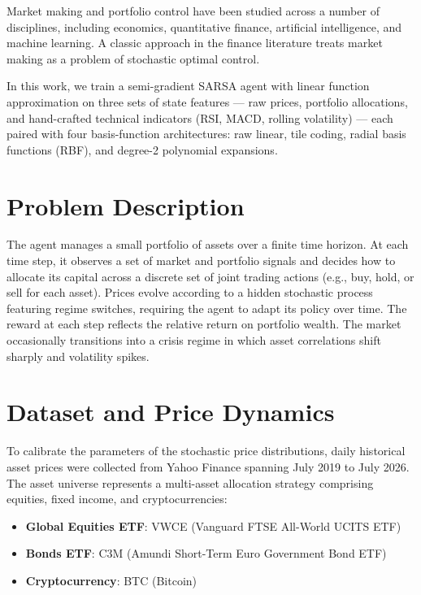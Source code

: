 \documentclass[pdflatex,sn-mathphys-num]{sn-jnl}
\begin{document}
Market making and portfolio control have been studied across a number of disciplines, 
including economics, quantitative finance, artificial intelligence, and machine learning. 
A classic approach in the finance literature treats market making as a problem of stochastic optimal control.

In this work, we train a semi-gradient SARSA agent with linear function approximation on three sets of state features 
--- raw prices, portfolio allocations, and hand-crafted technical indicators (RSI, MACD, rolling volatility) --- 
each paired with four basis-function architectures: raw linear, tile coding, radial basis functions (RBF), and degree-2 polynomial expansions. 

\section{Problem Description}
\label{sec:problem}

The agent manages a small portfolio of assets over a finite time horizon. At each time step, it observes a set of market and portfolio signals and decides how to allocate its capital across a discrete set of joint trading actions (e.g., buy, hold, or sell for each asset). Prices evolve according to a hidden stochastic process featuring regime switches, requiring the agent to adapt its policy over time. The reward at each step reflects the relative return on portfolio wealth. The market occasionally transitions into a crisis regime in which asset correlations shift sharply and volatility spikes.

\section{Dataset and Price Dynamics}
\label{sec:data}

To calibrate the parameters of the stochastic price distributions, daily historical asset prices were collected from Yahoo Finance spanning July 2019 to July 2026. The asset universe represents a multi-asset allocation strategy comprising equities, fixed income, and cryptocurrencies:
\begin{itemize}
    \item \textbf{Global Equities ETF}: VWCE (Vanguard FTSE All-World UCITS ETF)
    \item \textbf{Bonds ETF}: C3M (Amundi Short-Term Euro Government Bond ETF)
    \item \textbf{Cryptocurrency}: BTC (Bitcoin)
\end{itemize}
\end{document}
